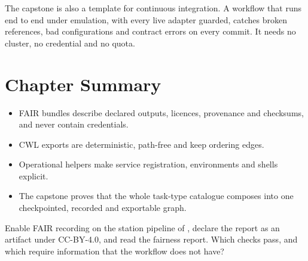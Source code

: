

\begin{practicebox}
The capstone is also a template for continuous integration. A workflow that
runs end to end under emulation, with every live adapter guarded, catches
broken references, bad configurations and contract errors on every commit.
It needs no cluster, no credential and no quota.
\end{practicebox}

\section{Chapter Summary}

\begin{itemize}[leftmargin=1.4em]
  \item FAIR bundles describe declared outputs, licences, provenance and
    checksums, and never contain credentials.
  \item CWL exports are deterministic, path-free and keep ordering edges.
  \item Operational helpers make service registration, environments and
    shells explicit.
  \item The capstone proves that the whole task-type catalogue composes into
    one checkpointed, recorded and exportable graph.
\end{itemize}

\begin{exercise}
Enable FAIR recording on the station pipeline of ,
declare the report as an artifact under CC-BY-4.0, and read the fairness
report. Which checks pass, and which require information that the workflow
does not have?
\end{exercise}
